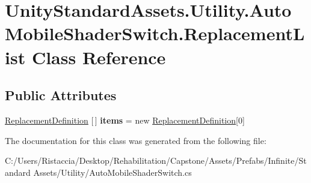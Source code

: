 \hypertarget{class_unity_standard_assets_1_1_utility_1_1_auto_mobile_shader_switch_1_1_replacement_list}{}\section{Unity\+Standard\+Assets.\+Utility.\+Auto\+Mobile\+Shader\+Switch.\+Replacement\+List Class Reference}
\label{class_unity_standard_assets_1_1_utility_1_1_auto_mobile_shader_switch_1_1_replacement_list}
\subsection*{Public Attributes}
\begin{DoxyCompactItemize}
\item 
\mbox{\label{class_unity_standard_assets_1_1_utility_1_1_auto_mobile_shader_switch_1_1_replacement_list_a66f83004343262d054bd122a2ea6cb9f}} 
\hyperlink{class_unity_standard_assets_1_1_utility_1_1_auto_mobile_shader_switch_1_1_replacement_definition}{Replacement\+Definition} \mbox{[}$\,$\mbox{]} {\bfseries items} = new \hyperlink{class_unity_standard_assets_1_1_utility_1_1_auto_mobile_shader_switch_1_1_replacement_definition}{Replacement\+Definition}\mbox{[}0\mbox{]}
\end{DoxyCompactItemize}


The documentation for this class was generated from the following file\+:\begin{DoxyCompactItemize}
\item 
C\+:/\+Users/\+Ristaccia/\+Desktop/\+Rehabilitation/\+Capstone/\+Assets/\+Prefabs/\+Infinite/\+Standard Assets/\+Utility/Auto\+Mobile\+Shader\+Switch.\+cs\end{DoxyCompactItemize}
